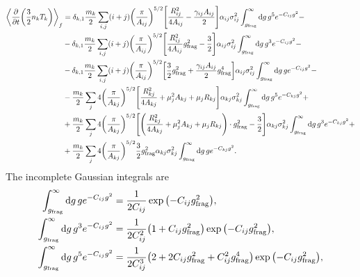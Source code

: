 \documentclass[aps,prl,preprint,groupedaddress,10pt]{revtex4-2}
\begin{document}
\begin{equation}
    \begin{split}
        \avg{\pdv{t}\pqty{\frac{3}{2}n_kT_k}}_f&=\delta_{k,1}\frac{m_k}{2}
        \sum_{i,j}(i+j)\pqty{\frac{\pi}{A_{ij}}}^{5/2}
        \bqty{\frac{R_{ij}^2}{4A_{ij}}-\frac{\gamma_{ij}A_{ij}}{2}}
        \alpha_{ij}\sigma_{ij}^2\int_{\ltx{g}{frag}}^{\infty}
        \dd{g}g^5e^{-C_{ij}g^2}-\\
        &-\delta_{k,1}\frac{m_k}{2}
        \sum_{i,j}(i+j)\pqty{\frac{\pi}{A_{ij}}}^{5/2}
        \bqty{\frac{R_{ij}^2}{4A_{ij}}\ltx{g}{frag}^2-\frac{3}{2}}
        \alpha_{ij}\sigma_{ij}^2
        \int_{\ltx{g}{frag}}^{\infty}
        \dd{g}g^3e^{-C_{ij}g^2}-\\
        &-\delta_{k,1}\frac{m_k}{2}
        \sum_{i,j}(i+j)\pqty{\frac{\pi}{A_{ij}}}^{5/2}
        \bqty{\frac{3}{2}\ltx{g}{frag}^2+\frac{\gamma_{ij}A_{ij}}{2}\ltx{g}{frag}^4}
        \alpha_{ij}\sigma_{ij}^2
        \int_{\ltx{g}{frag}}^{\infty}\dd{g}ge^{-C_{ij}g^2}-\\
        &-\frac{m_k}{2}\sum_{j}4\pqty{\frac{\pi}{A_{kj}}}^{5/2}
        \bqty{\frac{R_{kj}^2}{4A_{kj}}+\mu_j^2A_{kj}+\mu_jR_{kj}}
        \alpha_{kj}\sigma_{kj}^2\int_{\ltx{g}{frag}}^{\infty}
        \dd{g}g^5 e^{-C_{kj}g^2}+\\
        &+\frac{m_k}{2}\sum_{j}4\pqty{\frac{\pi}{A_{kj}}}^{5/2}
        \bqty{\pqty{\frac{R_{kj}^2}{4A_{kj}}+\mu_j^2A_{kj}+\mu_jR_{kj}}\cdot\ltx{g}{frag}^2
        -\frac{3}{2}}
        \alpha_{kj}\sigma_{kj}^2\int_{\ltx{g}{frag}}^{\infty}
        \dd{g}g^3e^{-C_{kj}g^2}+\\
        &+\frac{m_k}{2}\sum_{j}4\pqty{\frac{\pi}{A_{kj}}}^{5/2}
        \frac{3}{2}\ltx{g}{frag}^2\alpha_{kj}
        \sigma_{kj}^2\int_{\ltx{g}{frag}}^{\infty}
        \dd{g}ge^{-C_{kj}g^2}.
    \end{split}
\end{equation}
The incomplete Gaussian integrals are
\begin{equation}
    \begin{split}
        \int_{\ltx{g}{frag}}^{\infty}\dd{g}g e^{-C_{ij}g^2}&=
        \frac{1}{2C_{ij}}\exp\pqty{-C_{ij}\ltx{g}{frag}^2},\\
        \int_{\ltx{g}{frag}}^{\infty}\dd{g}g^3 e^{-C_{ij}g^2}&=
        \frac{1}{2C_{ij}^2}\pqty{1+C_{ij}\ltx{g}{frag}^2}\exp\pqty{-C_{ij}\ltx{g}{frag}^2},\\
        \int_{\ltx{g}{frag}}^{\infty}\dd{g}g^5 e^{-C_{ij}g^2}&=
        \frac{1}{2C_{ij}^3}\pqty{2+2C_{ij}\ltx{g}{frag}^2+C_{ij}^2\ltx{g}{frag}^4}
        \exp\pqty{-C_{ij}\ltx{g}{frag}^2},
    \end{split}
\end{equation}
\end{document}

